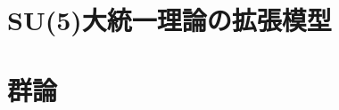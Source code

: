 \documentclass[uplatex,dvipdfmx,a4paper,titlepage]{jsreport}
\theoremstyle{plain}
\theoremstyle{definition}
\begin{document}



\chapter{SU(5)大統一理論の拡張模型}


\appendix
\chapter{群論}




\end{document}

